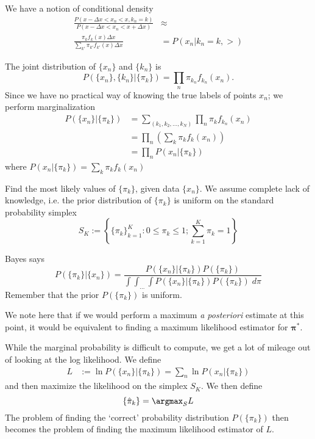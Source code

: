 We have a notion of conditional density
\begin{align*}
\frac{P\left(x-\Delta x<x_n<x,k_n=k\right)}{P\left(x-\Delta x < x_n <x+\Delta x\right)}&\approx\\ \frac{\pi_kf_k(x)\Delta x}{\sum_{k'} \pi_{k'}f_{k'}(x) \Delta x}&=P(x_n|k_n=k,\gt)
\end{align*}

The joint distribution of $\{x_n\}$ and $\{k_n\}$ is 
\[P(\{x_n\}, \{k_n\}|\{\pi_k\})=\prod_n \pi_{k_n}f_{k_n}(x_n).\]
Since we have no practical way of knowing the true labels of points $x_n$; we perform marginalization
\begin{align*}
P(\{x_n\}|\{\pi_k\})&=\sum_{(k_1,k_2,\ldots,k_N)}\prod_n \pi_{k}f_{k_n}(x_n)\\
&= \prod_n \left(\sum_{k}\pi_kf_k(x_n)\right)\\
&= \prod_n P(x_n|\{\pi_k\})
\end{align*}
where $\displaystyle{P(x_n|\{\pi_k\}) =\sum_{k}\pi_kf_k(x_n)}$

\begin{eg} Find the most likely values of $\{\pi_k\}$, given data $\{x_n\}$. We assume complete lack of knowledge, i.e. the prior distribution of $\{\pi_k\}$ is uniform on the standard probability simplex 
\begin{equation}\label{simplexDef}
	S_K:=\left\{\{\pi_k\}_{k=1}^{K}:0\leq \pi_k\leq 1; \sum_{k=1}^{K}\pi_k =1\right\}
\end{equation}

\end{eg}

\begin{soln}
Bayes says
 \[P(\{\pi_k\}|\{x_n\})=\frac{P(\{x_n\}|\{\pi_k\})P(\{\pi_k\})}{\int\int_{\ldots}\int P(\{x_n\}|\{\pi_k\})P(\{\pi_k\})\; d\pi}\]
 Remember that the prior $P(\{\pi_k\})$ is uniform.
\end{soln}
We note here that if we would perform a maximum \textit{a posteriori} estimate at this point, it would be equivalent to finding a maximum likelihood estimator for $\bm\pi^\ast$.

While the marginal probability is difficult to compute, we get a lot of mileage out of looking at the log likelihood.  We define
\begin{align*}
L&:= \ln P(\{x_n\}|\{\pi_k\}) = \sum_n \ln P(x_n|\{\pi_k\})
\end{align*}
and then maximize the likelihood on the simplex $S_K$.
We then define 
\[\{\hat{\pi}_k\}=\argmax_S L\]
The problem of finding the `correct' probability distribution $P(\{\pi_k\})$ then becomes the problem of finding the maximum likelihood estimator of $L$.  

